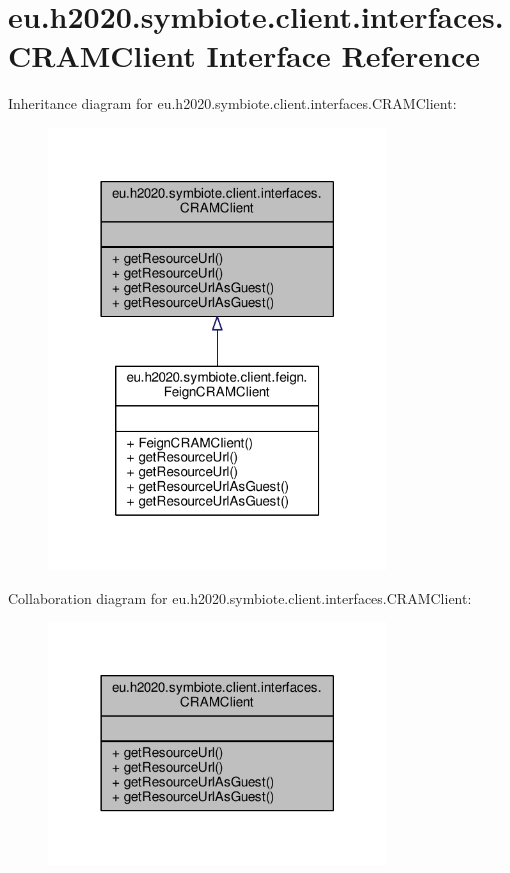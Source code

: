 \hypertarget{interfaceeu_1_1h2020_1_1symbiote_1_1client_1_1interfaces_1_1CRAMClient}{}\section{eu.\+h2020.\+symbiote.\+client.\+interfaces.\+C\+R\+A\+M\+Client Interface Reference}
\label{interfaceeu_1_1h2020_1_1symbiote_1_1client_1_1interfaces_1_1CRAMClient}


Inheritance diagram for eu.\+h2020.\+symbiote.\+client.\+interfaces.\+C\+R\+A\+M\+Client\+:\nopagebreak
\begin{figure}[H]
\begin{center}
\leavevmode
\includegraphics[width=254pt]{interfaceeu_1_1h2020_1_1symbiote_1_1client_1_1interfaces_1_1CRAMClient__inherit__graph}
\end{center}
\end{figure}


Collaboration diagram for eu.\+h2020.\+symbiote.\+client.\+interfaces.\+C\+R\+A\+M\+Client\+:\nopagebreak
\begin{figure}[H]
\begin{center}
\leavevmode
\includegraphics[width=254pt]{interfaceeu_1_1h2020_1_1symbiote_1_1client_1_1interfaces_1_1CRAMClient__coll__graph}
\end{center}
\end{figure}
